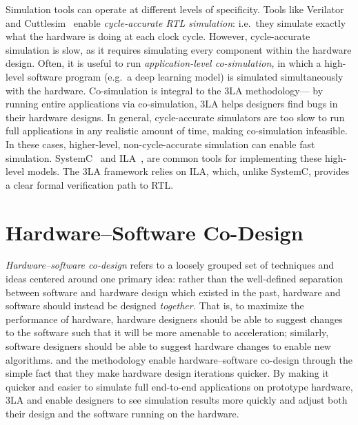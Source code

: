 Simulation tools can operate
  at different levels of specificity.
Tools like Verilator~\cite{verilator} and Cuttlesim~\cite{pitclaudel2021cuttlesim} enable \textit{cycle-accurate RTL simulation}:
  i.e.~they simulate exactly what the hardware
  is doing
  at each clock cycle.
However,
  cycle-accurate simulation is slow,
  as it requires simulating
  every component within the hardware design.
Often, it is useful to run
  \textit{application-level co-simulation,} 
  in which a high-level software program
  (e.g.~a deep learning model)
  is simulated simultaneously with the hardware.
Co-simulation is integral
  to the 3LA methodology---%
  by running entire applications
  via co-simulation, 3LA helps designers
  find bugs in their hardware designs.
In general, cycle-accurate simulators
  are too slow to run full applications
  in any realistic amount of time,
  making co-simulation infeasible.
In these cases,
  higher-level, non-cycle-accurate simulation
  can enable fast simulation.
SystemC~\cite{SystemC}
  and ILA~\cite{todo},
  are common tools for implementing
  these high-level models.
The 3LA framework relies on ILA, which,
  unlike SystemC,
  provides
  a clear formal verification path to RTL.
  
%
  

\section{Hardware--Software Co-Design}

\textit{Hardware--software co-design}
  refers to a loosely grouped
  set of techniques and ideas
  centered around one primary idea:
  rather than the well-defined separation
  between software and hardware design
  which existed in the past,
  hardware and software
  should instead be designed \textit{together.}
That is, to maximize
  the performance of hardware,
  hardware designers should be able to suggest
  changes to the software
  such that it will be more amenable to acceleration;
  similarly,
  software designers should be able to suggest
  hardware changes
  to enable new algorithms.
\g and the 
  \TLA methodology enable
  hardware--software co-design
  through the simple fact that
  they make
  hardware design iterations quicker.
By making it quicker and easier
  to simulate full end-to-end
  applications
  on prototype hardware,
  3LA and \g enable designers
  to see simulation results more quickly
  and adjust both their design
  and the software running on the hardware.

